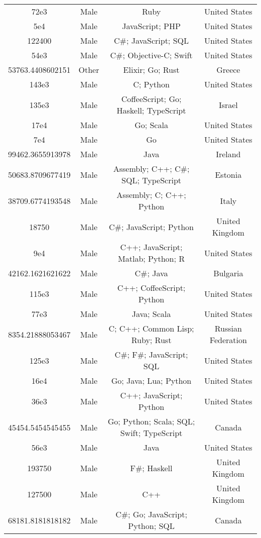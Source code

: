 \begin{center}
\begin{tabular}{ |c|c|c|c| }
72e3  &  Male  &  Ruby  &  United States  \\ 
5e4  &  Male  &  JavaScript; PHP  &  United States  \\ 
122400  &  Male  &  C\#; JavaScript; SQL  &  United States  \\ 
54e3  &  Male  &  C\#; Objective-C; Swift  &  United States  \\ 
53763.4408602151  &  Other  &  Elixir; Go; Rust  &  Greece  \\ 
143e3  &  Male  &  C; Python  &  United States  \\ 
135e3  &  Male  &  CoffeeScript; Go; Haskell; TypeScript  &  Israel  \\ 
17e4  &  Male  &  Go; Scala  &  United States  \\ 
7e4  &  Male  &  Go  &  United States  \\ 
99462.3655913978  &  Male  &  Java  &  Ireland  \\ 
50683.8709677419  &  Male  &  Assembly; C++; C\#; SQL; TypeScript  &  Estonia  \\ 
38709.6774193548  &  Male  &  Assembly; C; C++; Python  &  Italy  \\ 
18750  &  Male  &  C\#; JavaScript; Python  &  United Kingdom  \\ 
9e4  &  Male  &  C++; JavaScript; Matlab; Python; R  &  United States  \\ 
42162.1621621622  &  Male  &  C\#; Java  &  Bulgaria  \\ 
115e3  &  Male  &  C++; CoffeeScript; Python  &  United States  \\ 
77e3  &  Male  &  Java; Scala  &  United States  \\ 
8354.21888053467  &  Male  &  C; C++; Common Lisp; Ruby; Rust  &  Russian Federation  \\ 
125e3  &  Male  &  C\#; F\#; JavaScript; SQL  &  United States  \\ 
16e4  &  Male  &  Go; Java; Lua; Python  &  United States  \\ 
36e3  &  Male  &  C++; JavaScript; Python  &  United States  \\ 
45454.5454545455  &  Male  &  Go; Python; Scala; SQL; Swift; TypeScript  &  Canada  \\ 
56e3  &  Male  &  Java  &  United States  \\ 
193750  &  Male  &  F\#; Haskell  &  United Kingdom  \\ 
127500  &  Male  &  C++  &  United Kingdom  \\ 
68181.8181818182  &  Male  &  C\#; Go; JavaScript; Python; SQL  &  Canada  \\ 

\end{tabular}
\end{center}
